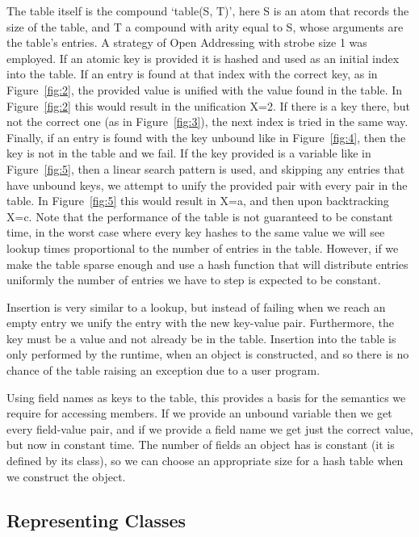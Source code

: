 \documentclass[12pt,a4paper,twoside,openright]{report}
\begin{document}
The table itself is the compound `table(S, T)', here S is an atom that records the size of the table, and T a compound with arity equal to S, whose arguments are the table's entries. A strategy of Open Addressing with strobe size 1 was employed. If an atomic key is provided it is hashed and used as an initial index into the table. If an entry is found at that index with the correct key, as in Figure~\ref{fig:2}, the provided value is unified with the value found in the table. In Figure~\ref{fig:2} this would result in the unification X=2. If there is a key there, but not the correct one (as in Figure~\ref{fig:3}), the next index is tried in the same way. Finally, if an entry is found with the key unbound like in Figure~\ref{fig:4}, then the key is not in the table and we fail. If the key provided is a variable like in Figure~\ref{fig:5}, then a linear search pattern is used, and skipping any entries that have unbound keys, we attempt to unify the provided pair with every pair in the table. In Figure~\ref{fig:5} this would result in X=a, and then upon backtracking X=c. Note that the performance of the table is not guaranteed to be constant time, in the worst case where every key hashes to the same value we will see lookup times proportional to the number of entries in the table. However, if we make the table sparse enough and use a hash function that will distribute entries uniformly the number of entries we have to step is expected to be constant. 

\bigskip

Insertion is very similar to a lookup, but instead of failing when we reach an empty entry we unify the entry with the new key-value pair. Furthermore, the key must be a value and not already be in the table. Insertion into the table is only performed by the runtime, when an object is constructed, and so there is no chance of the table raising an exception due to a user program. 

\bigskip

Using field names as keys to the table, this provides a basis for the semantics we require for accessing members. If we provide an unbound variable then we get every field-value pair, and if we provide a field name we get just the correct value, but now in constant time. The number of fields an object has is constant (it is defined by its class), so we can choose an appropriate size for a hash table when we construct the object.

	\subsection{Representing Classes}
	
\end{document}
